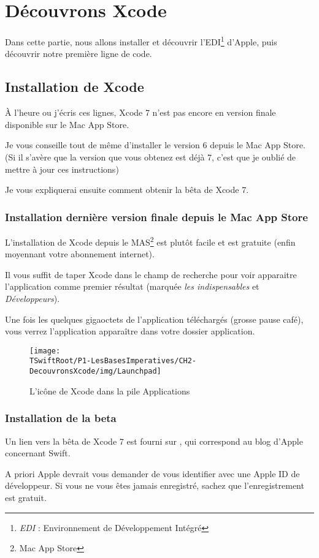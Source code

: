 \chapter{Découvrons Xcode}
Dans cette partie, nous allons installer et découvrir l'EDI\footnote{\emph{EDI} : Environnement de Développement Intégré} d’Apple,
puis découvrir notre première ligne de code.
\section{Installation de Xcode}
À l'heure ou j'écris ces lignes, Xcode 7 n'est pas encore en version finale disponible sur le Mac App Store.

Je vous conseille tout de même d'installer le version 6 depuis le Mac App Store. (Si il s'avère que la version que vous obtenez est déjà 7, c'est que je oublié de mettre à jour ces instructions)

Je vous expliquerai ensuite comment obtenir la bêta de Xcode 7.

\subsection{Installation dernière version finale depuis le Mac App Store}
L'installation de Xcode depuis le MAS\footnote{Mac App Store} est plutôt facile et est gratuite (enfin moyennant votre abonnement internet).

Il vous suffit de taper Xcode dans le champ de recherche pour voir apparaitre l'application comme premier résultat (marquée \emph{les indispensables} et \emph{Développeurs}).

Une fois les quelques gigaoctets de l'application téléchargés
(grosse pause café),
vous verrez l'application apparaître dans votre dossier application.
\begin{figure}[H]
\centering
\texttt{[image: \\TSwiftRoot/P1-LesBasesImperatives/CH2-DecouvronsXcode/img/Launchpad]}
\caption{L'icône de Xcode dans la pile \og Applications \fg{}}
\end{figure}

\subsection{Installation de la beta}
Un lien vers la bêta de Xcode 7 est fourni sur , qui correspond au blog d'Apple concernant Swift.

A priori Apple devrait vous demander de vous identifier avec une Apple ID de développeur. Si vous ne vous êtes jamais enregistré, sachez que l'enregistrement est gratuit.

